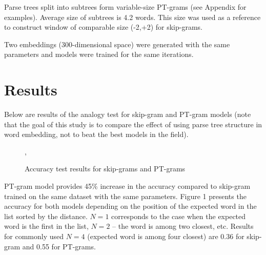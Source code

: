 \documentclass[12pt]{article}
\begin{document}
Parse trees split into subtrees form variable-size PT-grams
(see Appendix for examples).
Average size of subtrees is 4.2 words.
This size was used as a reference to construct
window of comparable size (-2,+2) for skip-grams.

Two embeddings (300-dimensional space)
were generated with the same parameters and models were trained
for the same iterations.

\section{Results}

Below are results of the analogy test for skip-gram and PT-gram
models (note that the goal of this study is to compare the effect
of using parse tree structure in word embedding, not to beat the
best models in the field).

\begin{center}
\begin{figure}[H]
\caption{Accuracy test results for skip-grams and PT-grams},
\centering
{}
\end{figure}
\end{center}

PT-gram model provides 45\% increase in the accuracy compared
to skip-gram trained on the same dataset with the same parameters.
Figure 1 presents the accuracy for both models depending on the
position of the expected word in the list sorted by the distance.
$N=1$ corresponds to the case when the expected word is the first in the
list, $N=2$ -- the word is among two closest, etc. Results for
commonly used $N=4$ (expected word is among four closest) are 0.36 for
skip-gram and 0.55 for PT-grams.

\end{document}
